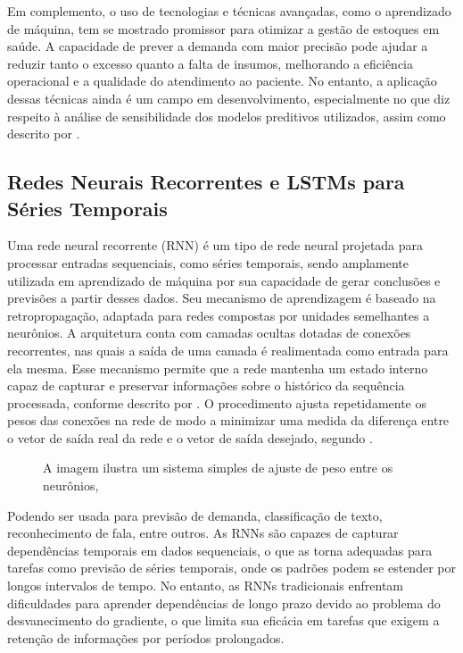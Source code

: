 \documentclass[
    12pt,                %
    openright,           %
    oneside,             %
    a4paper,             %
    english,             %
    brazil               %
]{abntex2}
\begin{document}
Em complemento, o uso de tecnologias e técnicas avançadas, como o aprendizado de máquina, tem se mostrado promissor para otimizar a gestão de estoques em saúde. A capacidade de prever a demanda com maior precisão pode ajudar a reduzir tanto o excesso quanto a falta de insumos, melhorando a eficiência operacional e a qualidade do atendimento ao paciente. No entanto, a aplicação dessas técnicas ainda é um campo em desenvolvimento, especialmente no que diz respeito à análise de sensibilidade dos modelos preditivos utilizados, assim como descrito por .

\subsection{Redes Neurais Recorrentes e LSTMs para Séries Temporais}
\label{subsec:rnn_lstm}

Uma rede neural recorrente (RNN) é um tipo de rede neural projetada para processar entradas sequenciais, como séries temporais, sendo amplamente utilizada em aprendizado de máquina por sua capacidade de gerar conclusões e previsões a partir desses dados. Seu mecanismo de aprendizagem é baseado na retropropagação, adaptada para redes compostas por unidades semelhantes a neurônios. A arquitetura conta com camadas ocultas dotadas de conexões recorrentes, nas quais a saída de uma camada é realimentada como entrada para ela mesma. Esse mecanismo permite que a rede mantenha um estado interno capaz de capturar e preservar informações sobre o histórico da sequência processada, conforme descrito por . O procedimento ajusta repetidamente os pesos das conexões na rede de modo a minimizar uma medida da diferença entre o vetor de saída real da rede e o vetor de saída desejado, segundo .

\begin{figure}[H]
    \centering
    \caption{A imagem ilustra um sistema simples de ajuste de peso entre os neurônios, }
    \label{fig:rumelhart}
\end{figure}

Podendo ser usada para previsão de demanda, classificação de texto, reconhecimento de fala, entre outros. As RNNs são capazes de capturar dependências temporais em dados sequenciais, o que as torna adequadas para tarefas como previsão de séries temporais, onde os padrões podem se estender por longos intervalos de tempo. No entanto, as RNNs tradicionais enfrentam dificuldades para aprender dependências de longo prazo devido ao problema do desvanecimento do gradiente, o que limita sua eficácia em tarefas que exigem a retenção de informações por períodos prolongados.
\end{document}
